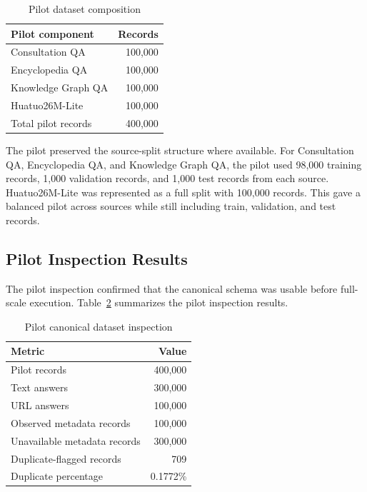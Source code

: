 \documentclass[12pt,a4paper]{article}
\begin{document}
\begin{table}[H]
\centering
\caption{Pilot dataset composition}
\label{tab:pilot-composition}
\begin{tabular}{lr}
\toprule
Pilot component & Records \\
\midrule
Consultation QA & 100,000 \\
Encyclopedia QA & 100,000 \\
Knowledge Graph QA & 100,000 \\
Huatuo26M-Lite & 100,000 \\
\midrule
Total pilot records & 400,000 \\
\bottomrule
\end{tabular}
\end{table}

The pilot preserved the source-split structure where available. For Consultation QA, Encyclopedia QA, and Knowledge Graph QA, the pilot used 98,000 training records, 1,000 validation records, and 1,000 test records from each source. Huatuo26M-Lite was represented as a full split with 100,000 records. This gave a balanced pilot across sources while still including train, validation, and test records.

\subsection{Pilot Inspection Results}

The pilot inspection confirmed that the canonical schema was usable before full-scale execution. Table~\ref{tab:pilot-summary} summarizes the pilot inspection results.

\begin{table}[H]
\centering
\caption{Pilot canonical dataset inspection}
\label{tab:pilot-summary}
\begin{tabular}{lr}
\toprule
Metric & Value \\
\midrule
Pilot records & 400,000 \\
Text answers & 300,000 \\
URL answers & 100,000 \\
Observed metadata records & 100,000 \\
Unavailable metadata records & 300,000 \\
Duplicate-flagged records & 709 \\
Duplicate percentage & 0.1772\% \\
\bottomrule
\end{tabular}
\end{table}
\end{document}
